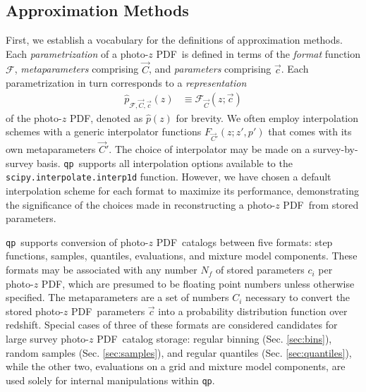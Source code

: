 \documentclass[\docopts]{\docclass}
\newcommand{\qp}{\texttt{qp}}
\newcommand{\pz}{photo-$z$ PDF}
\begin{document}
\subsection{Approximation Methods}
\label{sec:approx}

First, we establish a vocabulary for the definitions of approximation methods.
Each \textit{parametrization} of a \pz\ is defined in terms of the
\textit{format} function $\mathcal{F}$, \textit{metaparameters} comprising
$\vec{C}$, and \textit{parameters} comprising $\vec{c}$.  Each parametrization
in turn corresponds to a \textit{representation}
\begin{align}
  \label{eq:definition}
  \hat{p}_{\mathcal{F}, \vec{C}, \vec{c}}(z) &\equiv \mathcal{F}_{\vec{C}}(z;
\vec{c})
\end{align}
of the \pz, denoted as $\hat{p}(z)$ for brevity.  We often employ interpolation
schemes with a generic interpolator functions $F_{\vec{C}'}(z; z', p')$ that
comes with its own metaparameters $\vec{C}'$.  The choice of interpolator may
be made on a survey-by-survey basis.  \qp\ supports all interpolation options
available to the \texttt{scipy.interpolate.interp1d} function.  However, we
have chosen a default interpolation scheme for each format to maximize its
performance, demonstrating the significance of the choices made in
reconstructing a \pz\ from stored parameters.

\qp\ supports conversion of \pz\ catalogs between five formats: step functions,
samples, quantiles, evaluations, and mixture model components.  These formats
may be associated with any number $N_{f}$ of stored parameters $c_{i}$ per \pz,
which are presumed to be floating point numbers unless otherwise specified.
The metaparameters are a set of numbers $C_{i}$ necessary to convert the stored
\pz\ parameters $\vec{c}$ into a probability distribution function over
redshift.  Special cases of three of these formats are considered candidates
for large survey \pz\ catalog storage: regular binning (Sec. \ref{sec:bins}),
random samples (Sec. \ref{sec:samples}), and regular quantiles (Sec.
\ref{sec:quantiles}), while the other two, evaluations on a grid and mixture
model components, are used solely for internal manipulations within \qp.
\end{document}
